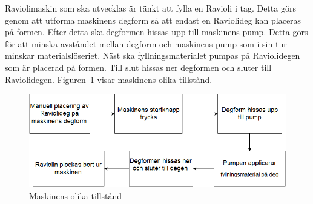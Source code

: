 Raviolimaskin som ska utvecklas är tänkt att fylla en Ravioli i tag. Detta görs genom att utforma maskinens degform så att endast en Raviolideg kan placeras på formen. Efter detta ska degformen hissas upp till maskinens pump. Detta görs för att minska avståndet mellan degform och maskinens pump som i sin tur minskar materialslöseriet. Näst ska fyllningsmaterialet pumpas på Raviolidegen som är placerad på formen. Till slut hissas ner degformen och sluter till Raviolidegen. Figuren~\ref{blockschema} visar maskinens olika tillstånd.

\begin{figure}[ht]
	\begin{center}
		\includegraphics[scale=0.8]{images/blockschema.png}
		\caption{Maskinens olika tillstånd}
		\label{blockschema}	
	\end{center}
\end{figure}

